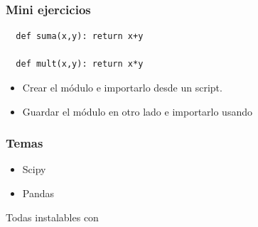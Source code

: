 \documentclass[14pt,aspectratio=169,xcolor=dvipsnames]{beamer}
\begin{document}
\begin{frame}
    \maketitle
\end{frame}
\begin{frame}[fragile]\frametitle{Mini ejercicios}
    \begin{verbatim}
  def suma(x,y): return x+y

  def mult(x,y): return x*y
    \end{verbatim}

    \begin{itemize}
        \item Crear el módulo  e importarlo desde un script.
        \item Guardar el módulo en otro lado e importarlo usando 
    \end{itemize}

\end{frame}
\begin{frame}\frametitle{Temas}
    \begin{itemize}
        \item Scipy
        \item Pandas
    \end{itemize}

    \vspace{1cm}
    Todas instalables con 
\end{frame}
\end{document}
